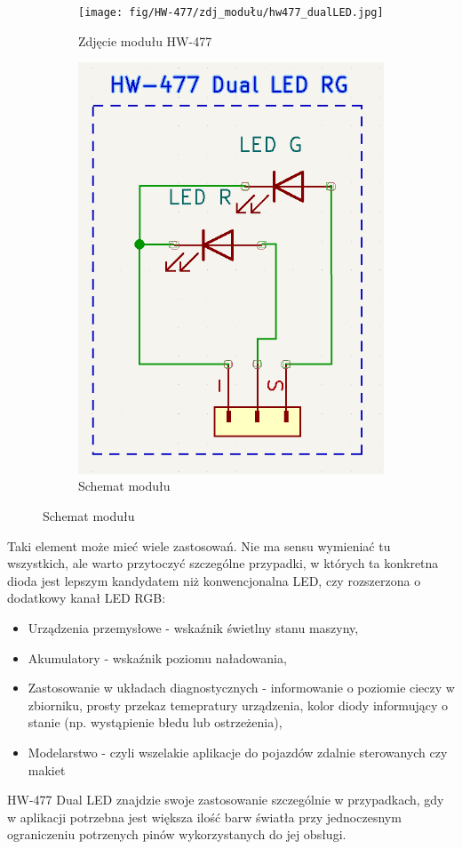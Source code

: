 \documentclass[11pt, a4paper]{article}
\begin{document}
\begin{figure}[h]
\centering
\begin{subfigure}{.5\textwidth}
\centering
\texttt{[image: fig/HW-477/zdj\_modułu/hw477\_dualLED.jpg]}
\caption{Zdjęcie modułu HW-477}
\label{fig:_zdjecie_modulu}
\end{subfigure}%
\begin{subfigure}{.5\textwidth}
\centering
\includegraphics[width=.4\linewidth]{fig/HW-477/polaczenie_modulu/hw-477_dualLED_scheme.PNG}
\caption{Schemat modułu}
\label{fig:_schemat_modulu}
\end{subfigure}
\label{fig:modul}
\end{figure}
\vspace{0.5cm}

\newpage
Taki element może mieć wiele zastosowań. Nie ma sensu wymieniać tu wszystkich, ale warto przytoczyć szczególne przypadki, w których ta konkretna dioda jest lepszym kandydatem niż konwencjonalna LED, czy rozszerzona o dodatkowy kanał LED RGB:
\vspace{0.5cm}
\begin{itemize}
    \item Urządzenia przemysłowe - wskaźnik świetlny stanu maszyny,
    \item Akumulatory - wskaźnik poziomu naładowania, 
    \item Zastosowanie w układach diagnostycznych - informowanie o poziomie cieczy w zbiorniku, prosty przekaz temepratury urządzenia, kolor diody informujący o stanie (np. wystąpienie błedu lub ostrzeżenia),
    \item Modelarstwo - czyli wszelakie aplikacje do pojazdów zdalnie sterowanych czy makiet
\end{itemize}
\vspace{0.5cm}
HW-477 Dual LED znajdzie swoje zastosowanie szczególnie w przypadkach, gdy w aplikacji potrzebna jest większa ilość barw światła przy jednoczesnym ograniczeniu potrzenych pinów wykorzystanych do jej obsługi.
\end{document}
